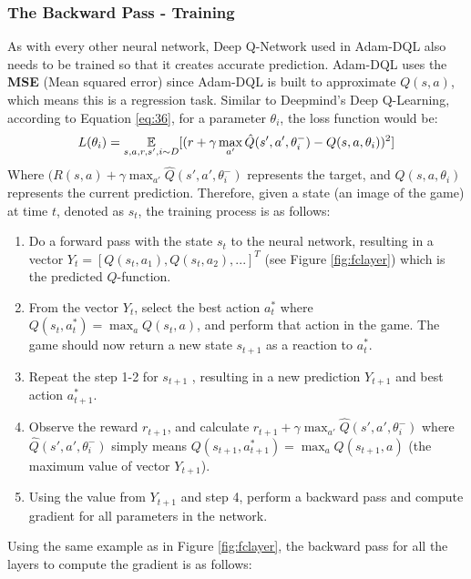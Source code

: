         \subsubsection{The Backward Pass - Training}
        As with every other neural network, Deep Q-Network used in Adam-DQL also needs to be trained so that it creates accurate prediction. Adam-DQL uses the \textbf{MSE} (Mean squared error) since Adam-DQL is built to approximate $Q(s,a)$, which means this is a regression task. Similar to Deepmind's Deep Q-Learning, according to Equation \ref{eq:36}, for a parameter $\theta_i$, the loss function would be:
        \begin{equation*}
            L(\theta_i)=\operatorname*{\mathbb{E}}_{s,a,r,s',i \sim D}[(r+\gamma \max_{a'}\hat{Q}(s',a',\theta_i^-)-Q(s,a,\theta_i))^2]
        \end{equation*}
        Where $(R(s,a)+\gamma \max_{a'}\hat{Q}(s',a',\theta_i^-)$ represents the target, and $Q(s,a,\theta_i)$ represents the current prediction. Therefore, given a state (an image of the game) at time $t$, denoted as $s_t$, the training process is as follows:
        \begin{enumerate}
            \item Do a forward pass with the state $s_t$ to the neural network, resulting in a vector $Y_t=[Q(s_t,a_1),Q(s_t,a_2),...]^T$ (see Figure \ref{fig:fclayer}) which is the predicted $Q$-function.
            \item From the vector $Y_t$, select the best action $a^*_t$ where $Q(s_t,a^*_t)=\max_a Q(s_t,a)$, and perform that action in the game. The game should now return a new state $s_{t+1}$ as a reaction to $a^*_t$.
            \item Repeat the step 1-2 for $s_{t+1}$ , resulting in a new prediction $Y_{t+1}$ and best action $a^*_{t+1}$.
            \item Observe the reward $r_{t+1}$, and calculate $r_{t+1}+\gamma \max_{a'}\hat{Q}(s',a',\theta_i^-)$ where $\hat{Q}(s',a',\theta_i^-)$ simply means $Q(s_{t+1},a^*_{t+1})=\max_a Q(s_{t+1},a)$ (the maximum value of vector $Y_{t+1}$).
            \item Using the value from $Y_{t+1}$ and step 4, perform a backward pass and compute gradient for all parameters in the network.
        \end{enumerate}
        Using the same example as in Figure \ref{fig:fclayer}, the backward pass for all the layers to compute the gradient is as follows:
